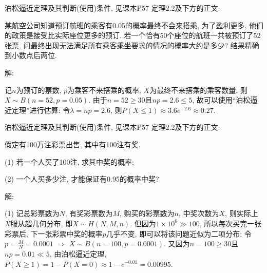 \documentclass[standard]{ExBook}
\begin{document}
\begin{qitems}
\begin{bbox}
\textcolor{themeColor}{\selectfont {} 泊松逼近定理及其判断(使用)条件, 见课本P57 定理2.2及下方的正文.}
    \end{bbox}

\vspace{-5em}

    \begin{bbox}
    \begin{shaded}
        \qitem
某航空公司知道预订航班的乘客有0.05的概率最终不会来搭乘, 为了盈利更多, 他们的政策是接受比实际座位更多的预订. 若一个恰有50个座位的航班一共被预订了52张票, 问最终出现无法满足所有乘客乘坐要求的情况的概率大约是多少? 结果精确到小数点后两位.
    \end{shaded}
    \end{bbox}

\vspace{-5em}

    \begin{bbox}
解: 

记$n$为预订的票数, $p$为乘客不来搭乘的概率, $X$为最终不来搭乘的乘客数量, 则$X\sim B(n=52,p=0.05)$. 由于$n=52\geq30$且$np=2.6 \leq 5$, 故可以使用``泊松逼近定理''进行估算: 令$\lambda=np=2.6$, 则$P(X \leq 1)\approx3.6e^{-2.6}\approx0.27$.

\textcolor{themeColor}{\selectfont {} 泊松逼近定理及其判断(使用)条件, 见课本P57 定理2.2及下方的正文.}
    \end{bbox}

\vspace{-5em}

    \begin{bbox}
    \begin{shaded}
        \qitem
假定有100万注彩票出售, 其中有100注有奖.

(1) 若一个人买了100注, 求其中奖的概率;

(2) 一个人买多少注, 才能保证有0.95的概率中奖?
    \end{shaded}
    \end{bbox}

\vspace{-5em}

    \begin{bbox}
解: 

(1) 记总彩票数为$N$, 有奖彩票数为$M$, 购买的彩票数为$n$, 中奖次数为$X$, 则实际上$X$服从超几何分布, 即$X\sim H(N,M,n)$. 但因为$1\times10^{6}\gg100$, 所以每次买完一张彩票后, 下一张彩票中奖的概率$p$几乎不变, 即可以将该问题近似为二项分布: 令$p=\frac{M}{N}=0.0001$ $\Longrightarrow$ $X\sim B(n=100,p=0.0001)$. 又因为$n=100\geq 30$且$np=0.01\ll5$, 由泊松逼近定理, $P(X \geq 1)=1-P(X=0)\approx1-e^{-0.01}=0.00995$.
    \end{bbox}


\end{qitems}
\end{document}
